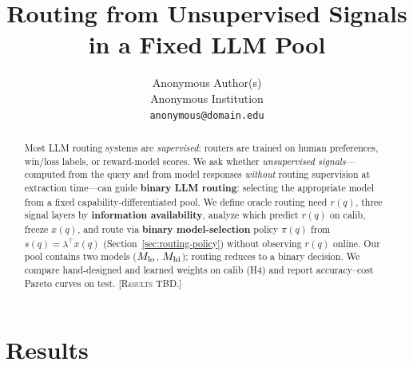 \documentclass[11pt]{article}
\title{Routing from Unsupervised Signals in a Fixed LLM Pool}
\author{
  Anonymous Author(s) \\
  Anonymous Institution \\
  \texttt{anonymous@domain.edu}
}
\begin{document}
\maketitle

\begin{abstract}
Most LLM routing systems are \emph{supervised}: routers are trained on human preferences, win/loss labels, or reward-model scores.
We ask whether \emph{unsupervised signals}---computed from the query and from model responses \emph{without} routing supervision at extraction time---can guide \textbf{binary LLM routing}: selecting the appropriate model from a fixed capability-differentiated pool.
We define oracle routing need $r(q)$, three signal layers by \textbf{information availability}, analyze which predict $r(q)$ on calib, freeze $x(q)$, and route via \textbf{binary model-selection} policy $\pi(q)$ from $s(q)=\lambda^\top x(q)$ (Section~\ref{sec:routing-policy}) without observing $r(q)$ online.
Our pool contains two models ($M_{\mathrm{lo}}$, $M_{\mathrm{hi}}$); routing reduces to a binary decision.
We compare hand-designed and learned weights on calib (H4) and report accuracy--cost Pareto curves on test.
\textsc{[Results TBD.]}
\end{abstract}







\section{Results}
\label{sec:results}









\end{document}

